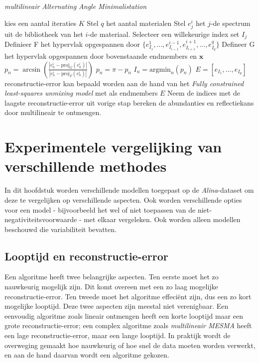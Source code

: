 \documentclass[12pt]{report}
\newcommand{\proj}[2]{\text{proj}_{#2}\left(#1\right)}
\begin{document}
\begin{algorithm}
\caption{\textit{multilineair Alternating Angle Minimalistation} \label{al:MAAM}}
\begin{algorithmic}[1]
\State kies een aantal iteraties $K$
\State Stel $q$ het aantal materialen
\State Stel $e_j^i$ het $j$-de spectrum uit de bibliotheek van het $i$-de materiaal.
\State Selecteer een willekeurige index set $I_j$
\State Definieer F het hypervlak opgespannen door $\{e^1_{I_1},...,e^{i-1}_{I_{i-1}},e^{i+1}_{I_{i+1}},...,e^q_{I_q}\}$
\State Defineer G het hypervlak opgespannen door bovenstaande endmembers en $\bm{x}$
\State $p_n = \arcsin \left(\frac{\left|e^i_n - \proj{e^i_n}{G}\right|}{\left|e^i_n - \proj{e^i_n}{F}\right|}\right)$
\If {$(e^i_n - \proj{e^i_n}{F}) \dot (x - proj{x}{F}) < 0$}
\State $p_n = \pi - p_n$
\EndIf
\EndFor
\EndFor
\State $I_n = \text{argmin}_n\left(p_n\right)$
\EndFor
\State $E = [e_{I_1},...,e_{I_p}]$
\State reconstructie-error kan bepaald worden aan de hand van het \textit{Fully constrained
least-squares unmixing model} met als endmembers $E$
\EndFor
\State Neem de indices met de laagste reconstructie-error uit vorige stap
\State bereken de abundanties en reflectiekans door multilineair te ontmengen. 
\end{algorithmic}
\end{algorithm}

\chapter{Experimentele vergelijking van verschillende methodes}

In dit hoofdstuk worden verschillende modellen toegepast op de \textit{Alina}-dataset om deze te vergelijken op verschillende aspecten. Ook worden verschillende opties voor een model - bijvoorbeeld het wel of niet toepassen van de niet-negativiteitsvoorwaarde - met elkaar vergeleken. Ook worden alleen modellen beschouwd die variabiliteit bevatten. 

\section{Looptijd en reconstructie-error}

Een algoritme heeft twee belangrijke aspecten. Ten eerste moet het zo nauwkeurig mogelijk zijn. Dit komt overeen met een zo laag mogelijke reconstructie-error. Ten tweede moet het algoritme effeci\"ent zijn, dus een zo kort mogelijke looptijd. Deze twee aspecten zijn meestal niet verenigbaar. Een eenvoudig algoritme zoals lineair ontmengen heeft een korte looptijd maar een grote reconstructie-error; een complex algoritme zoals \textit{multilineair MESMA} heeft een lage reconstructie-error, maar een lange looptijd. In praktijk wordt de overweging gemaakt hoe nauwkeurig of hoe snel de data moeten worden verwerkt, en aan de hand daarvan wordt een algoritme gekozen.
\end{document}
